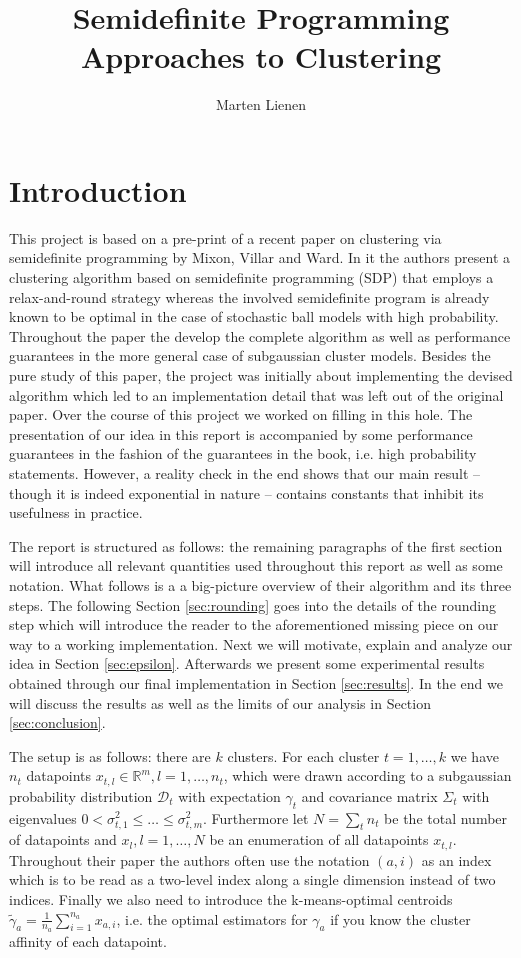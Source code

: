 \documentclass[10pt,a4paper]{article}
\title{Semidefinite Programming Approaches to Clustering}
\author{Marten Lienen}
\date{}
\begin{document}
\maketitle

\section{Introduction}

This project is based on a pre-print of a recent paper on clustering via semidefinite programming \cite{sdp} by Mixon, Villar and Ward.
In it the authors present a clustering algorithm based on semidefinite programming (SDP) that employs a relax-and-round strategy whereas the involved semidefinite program is already known to be optimal in the case of stochastic ball models with high probability.
Throughout the paper the develop the complete algorithm as well as performance guarantees in the more general case of subgaussian cluster models.
Besides the pure study of this paper, the project was initially about implementing the devised algorithm which led to an implementation detail that was left out of the original paper.
Over the course of this project we worked on filling in this hole.
The presentation of our idea in this report is accompanied by some performance guarantees in the fashion of the guarantees in the book, i.e. high probability statements.
However, a reality check in the end shows that our main result -- though it is indeed exponential in nature -- contains constants that inhibit its usefulness in practice.

The report is structured as follows: the remaining paragraphs of the first section will introduce all relevant quantities used throughout this report as well as some notation.
What follows is a a big-picture overview of their algorithm and its three steps.
The following Section \ref{sec:rounding} goes into the details of the rounding step which will introduce the reader to the aforementioned missing piece on our way to a working implementation.
Next we will motivate, explain and analyze our idea in Section \ref{sec:epsilon}.
Afterwards we present some experimental results obtained through our final implementation in Section \ref{sec:results}.
In the end we will discuss the results as well as the limits of our analysis in Section \ref{sec:conclusion}.

The setup is as follows: there are $k$ clusters.
For each cluster $t = 1, \dots, k$ we have $n_{t}$ datapoints $x_{t, l} \in \mathbb{R}^{m}, l = 1, \dots, n_{t}$, which were drawn according to a subgaussian probability distribution $\mathcal{D}_{t}$ with expectation $\gamma_{t}$ and covariance matrix $\Sigma_{t}$ with eigenvalues $0 < \sigma_{t, 1}^{2} \le \dots \le \sigma_{t, m}^{2}$.
Furthermore let $N = \sum_{t} n_{t}$ be the total number of datapoints and $x_{l}, l = 1, \dots, N$ be an enumeration of all datapoints $x_{t, l}$.
Throughout their paper the authors often use the notation $(a, i)$ as an index which is to be read as a two-level index along a single dimension instead of two indices.
Finally we also need to introduce the k-means-optimal centroids $\tilde{\gamma}_{a} = \frac{1}{n_{a}} \sum_{i = 1}^{n_{a}} x_{a, i}$, i.e. the optimal estimators for $\gamma_{a}$ if you know the cluster affinity of each datapoint.
\end{document}
